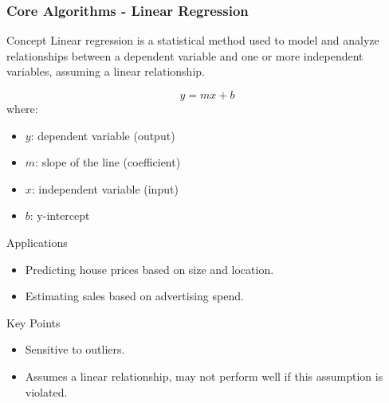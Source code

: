 \documentclass[aspectratio=169]{beamer}
\begin{document}
\begin{frame}[fragile]
    \frametitle{Core Algorithms - Linear Regression}
    \begin{block}{Concept}
        Linear regression is a statistical method used to model and analyze relationships between a dependent variable and one or more independent variables, assuming a linear relationship.
    \end{block}
    
    \begin{equation}
        y = mx + b
    \end{equation}
    where:
    \begin{itemize}
        \item $y$: dependent variable (output)
        \item $m$: slope of the line (coefficient)
        \item $x$: independent variable (input)
        \item $b$: y-intercept
    \end{itemize}
    
    \begin{block}{Applications}
        \begin{itemize}
            \item Predicting house prices based on size and location.
            \item Estimating sales based on advertising spend.
        \end{itemize}
    \end{block}

    \begin{block}{Key Points}
        \begin{itemize}
            \item Sensitive to outliers.
            \item Assumes a linear relationship, may not perform well if this assumption is violated.
        \end{itemize}
    \end{block}
\end{frame}
\end{document}
